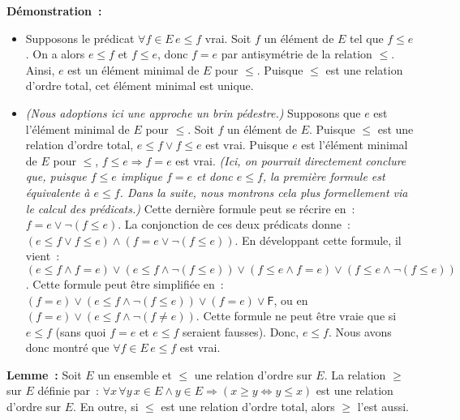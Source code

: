 \noindent\textbf{Démonstration :}
\begin{itemize}[nosep]
    \item Supposons le prédicat $\forall f \in E \, e \leq f$ vrai. 
        Soit $f$ un élément de $E$ tel que $f \leq e$. 
        On a alors $e \leq f$ et $f \leq e$, donc $f = e$ par antisymétrie de la relation $\leq$. 
        Ainsi, $e$ est un élément minimal de $E$ pour $\leq$.
        Puisque $\leq$ est une relation d'ordre total, cet élément minimal est unique.
    \item \textit{(Nous adoptions ici une approche un brin pédestre.)} 
        Supposons que $e$ est l'élément minimal de $E$ pour $\leq$.
        Soit $f$ un élément de $E$. 
        Puisque $\leq$ est une relation d'ordre total, $e \leq f \vee f \leq e$ est vrai.
        Puisque $e$ est l'élément minimal de $E$ pour $\leq$, $f \leq e \Rightarrow f = e$ est vrai. 
        \textit{(Ici, on pourrait directement conclure que, puisque $f \leq e$ implique $f = e$ et donc $e \leq f$, la première formule est équivalente à $e \leq f$. Dans la suite, nous montrons cela plus formellement \emph{via} le calcul des prédicats.)}
        Cette dernière formule peut se récrire en : $f = e \vee \neg (f \leq e)$.
        La conjonction de ces deux prédicats donne : $(e \leq f \vee f \leq e) \wedge (f = e \vee \neg (f \leq e))$.
        En développant cette formule, il vient : $(e \leq f \wedge f = e) \vee (e \leq f \wedge \neg (f \leq e)) \vee (f \leq e \wedge f = e) \vee (f \leq e \wedge \neg (f \leq e))$.
        Cette formule peut être simplifiée en : $(f = e) \vee (e \leq f \wedge \neg (f \leq e)) \vee (f = e) \vee \mathsf{F}$, 
        ou en $(f = e) \vee (e \leq f \wedge \neg (f \neq e))$.
        Cette formule ne peut être vraie que si $e \leq f$ (sans quoi $f = e$ et $e \leq f$ seraient fausses).
        Donc, $e \leq f$.
        Nous avons donc montré que $\forall f \in E \, e \leq f$ est vrai.
\end{itemize}
    
   \done 

\medskip

\noindent\textbf{Lemme :} Soit $E$ un ensemble et $\leq$ une relation d'ordre sur $E$. 
    La relation $\geq$ sur $E$ définie par : $\forall x \, \forall y \, x \in E \wedge y \in E \Rightarrow (x \geq y \Leftrightarrow y \leq x)$ est une relation d'ordre sur $E$. 
    En outre, si $\leq$ est une relation d'ordre total, alors $\geq$ l'est aussi.

\medskip

